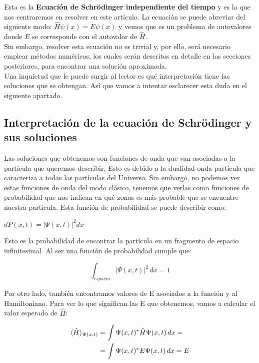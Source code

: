 \documentclass[12pt]{article}
\begin{document}
Esta es la \textbf{Ecuación de Schrödinger independiente del tiempo} y es la que nos centraremos en resolver en este artículo. 
La ecuación se puede abreviar del siguiente modo: $\hat{H} \psi (x)=E \psi (x)$ y vemos
que es un problema de autovalores donde $E$ se corresponde con el autovalor de $\hat{H}$. \\

Sin embargo, resolver esta ecuación no es trivial y, 
por ello, será necesario emplear métodos numéricos, 
los cuales serán descritos en detalle en las secciones posteriores, para encontrar una solución aproximada. \\

Una inquietud que le puede surgir al lector es qué interpretación
tiene las soluciones que se obtengan. Así que vamos a intentar esclarecer esta duda en el siguiente apartado.

\subsection{Interpretación de la ecuación de Schrödinger y sus soluciones}

Las soluciones que obtenemos son funciones de onda que van asociadas a la partícula que queremos describir. Esto es debido a la dualidad onda-partícula que caracteriza a todas las partículas del Universo. Sin embargo, no podemos ver estas funciones de onda del modo clásico, tenemos que verlas como
funciones de probabilidad que nos indican en qué zonas es más probable que se encuentre nuestra partícula. Esta función de probabilidad se puede describir como: 

\begin{center}
    $dP(x,t)=\left\lvert \Psi (x,t) \right\rvert^{2} dx$
\end{center}

Esto es la probabilidad de encontrar la partícula en un fragmento de espacio infinitesimal. Al ser una función de probabilidad cumple que:

\begin{equation}\label{eq:norm}
    \int_{espacio} \left\lvert \Psi (x,t) \right\rvert^{2} \,dx=1
\end{equation}

Por otro lado, también encontramos valores de E asociados a la función y al Hamiltoniano. Para ver lo que significan las E que obtenemos, vamos a calcular el valor esperado de $\hat{H}$:

\begin{align*}
\langle \hat{H} \rangle_{\Psi (x,t)} \notag 
&=\int \Psi (x,t)^{*} \hat{H} \Psi (x,t) \,dx= \notag \\
&=\int \Psi (x,t)^{*} E \Psi (x,t) \,dx= E
\end{align*}
\end{document}
